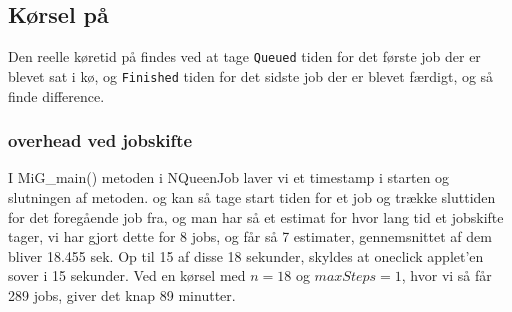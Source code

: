 \subsection{Kørsel på \mig}

Den reelle køretid på \mig findes ved at tage \texttt{Queued} tiden for det første job der er
blevet sat i kø, og \texttt{Finished} tiden for det sidste job der er blevet
færdigt, og så finde difference.

\subsubsection{overhead ved jobskifte}

I MiG\_main() metoden i NQueenJob laver vi et timestamp i starten og slutningen
af metoden.  og kan så tage start tiden for et job og trække sluttiden for det
foregående job fra, og man har så et estimat for hvor lang tid et jobskifte
tager, vi har gjort dette for 8 jobs, og får så 7 estimater, gennemsnittet af
dem bliver 18.455 sek.  Op til 15 af disse 18 sekunder, skyldes at oneclick
applet'en sover i 15 sekunder.  Ved en kørsel med $n=18$ og $maxSteps=1$, hvor
vi så får 289 jobs, giver det knap 89 minutter. 
